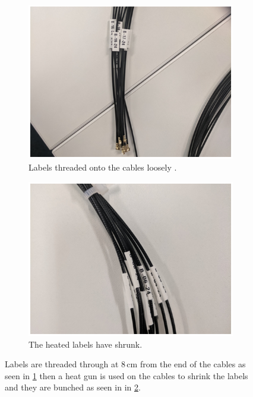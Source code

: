 \begin{figure}[htbp]
\centering
\begin{subfigure}{.5\textwidth}
  \centering
  \includegraphics[width=\linewidth]{Chapter3/Figs/Raster/detCon020b_LabelsLoose.png}
  \captionsetup{width=.9\linewidth}
  \caption{Labels threaded onto the cables loosely .}
  \label{subFig:detCon020b_LabelsLoose}
\end{subfigure}%
\begin{subfigure}{.5\textwidth}
  \centering
  \includegraphics[width=\linewidth]{Chapter3/Figs/Raster/detCon021b_LabelsHeated.png}
  \captionsetup{width=.9\linewidth}
  \caption{The heated labels have shrunk.}
  \label{subFig:detCon021b_LabelsHeated}
\end{subfigure}
\caption{Labels are threaded through at 8\,cm from the end of the cables as seen in \ref{subFig:detCon020b_LabelsLoose} then a heat gun is used on the cables to shrink the labels and they are bunched as seen in in \ref{subFig:detCon021b_LabelsHeated}.}
\label{fig:detCon_LabelsLoose_LabelsHeated}
\end{figure}

